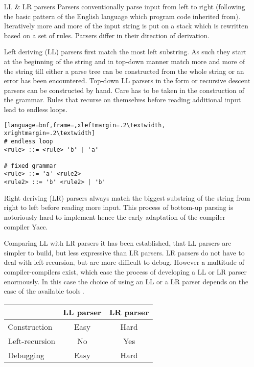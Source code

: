 \documentclass{scrartcl}
\begin{document}
\begin{info}{LL \& LR parsers}
Parsers conventionally parse input from left to right (following the basic
pattern of the English language which program code inherited from). Iteratively
more and more of the input string is put on a stack which is rewritten based on
a set of rules. Parsers differ in their direction of derivation.

Left deriving (LL) parsers first match the most left substring. As such they
start at the beginning of the string and in top-down manner match more and more
of the string till either a parse tree can be constructed from the whole string
or an error has been encountered. Top-down LL parsers in the form or recursive
descent parsers can be constructed by hand. Care has to be taken in the
construction of the grammar. Rules that recurse on themselves before reading
additional input lead to endless loops.
\vspace{0.25cm}
\begin{lstlisting}[language=bnf,frame=,xleftmargin=.2\textwidth, xrightmargin=.2\textwidth]
# endless loop
<rule> ::= <rule> 'b' | 'a'

# fixed grammar
<rule> ::= 'a' <rule2>
<rule2> ::= 'b' <rule2> | 'b'
\end{lstlisting}
\vspace{0.25cm}
Right deriving (LR) parsers always match the biggest substring of the string
from right to left before reading more input. This process of bottom-up parsing
is notoriously hard to implement hence the early adaptation of the
compiler-compiler Yacc.

Comparing LL with LR parsers it has been established, that LL parsers are
simpler to build, but less expressive than LR parsers. LR parsers do not have
to deal with left recursion, but are more difficult to debug. However a
multitude of compiler-compilers exist, which ease the process of developing a
LL or LR parser enormously. In this case the choice of using an LL or a LR
parser depends on the ease of the available tools \cite{website:llvslr}.

\begin{center}
    \begin{tabular}{lcc}
    & \textbf{LL parser} & \textbf{LR parser}\\\hline
    Construction & Easy & Hard\\
    Left-recursion & No & Yes\\
    Debugging & Easy & Hard\\
    \end{tabular}
\end{center}
\end{info}
\end{document}
